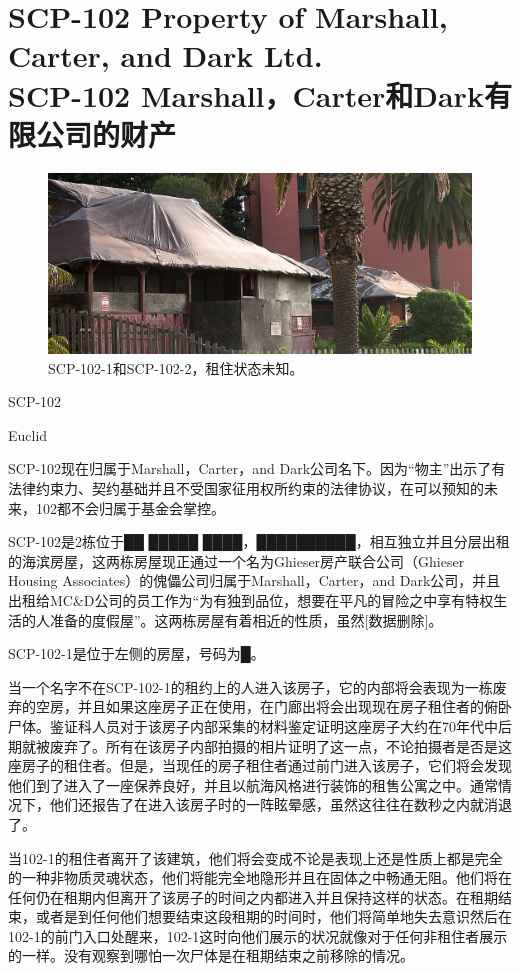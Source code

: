 \chapter[SCP-102 Marshall，Carter和Dark有限公司的财产]{
    SCP-102 Property of Marshall, Carter, and Dark Ltd.\\
    SCP-102 Marshall，Carter和Dark有限公司的财产
}

\label{chap:SCP-102}

\begin{figure}[H]
    \centering
    \includegraphics[width=0.5\linewidth]{images/SCP-102.png}
    \caption*{SCP-102-1和SCP-102-2，租住状态未知。}
\end{figure}

SCP-102

Euclid

SCP-102现在归属于Marshall，Carter，and Dark公司名下。因为“物主”出示了有法律约束力、契约基础并且不受国家征用权所约束的法律协议，在可以预知的未来，102都不会归属于基金会掌控。

SCP-102是2栋位于██ █████ ████，██████████，相互独立并且分层出租的海滨房屋，这两栋房屋现正通过一个名为Ghieser房产联合公司（Ghieser Housing Associates）的傀儡公司归属于Marshall，Carter，and Dark公司，并且出租给MC\&D公司的员工作为“为有独到品位，想要在平凡的冒险之中享有特权生活的人准备的度假屋”。这两栋房屋有着相近的性质，虽然{[}数据删除]。

SCP-102-1是位于左侧的房屋，号码为█。

当一个名字不在SCP-102-1的租约上的人进入该房子，它的内部将会表现为一栋废弃的空房，并且如果这座房子正在使用，在门廊出将会出现现在房子租住者的俯卧尸体。鉴证科人员对于该房子内部采集的材料鉴定证明这座房子大约在70年代中后期就被废弃了。所有在该房子内部拍摄的相片证明了这一点，不论拍摄者是否是这座房子的租住者。但是，当现任的房子租住者通过前门进入该房子，它们将会发现他们到了进入了一座保养良好，并且以航海风格进行装饰的租售公寓之中。通常情况下，他们还报告了在进入该房子时的一阵眩晕感，虽然这往往在数秒之内就消退了。

当102-1的租住者离开了该建筑，他们将会变成不论是表现上还是性质上都是完全的一种非物质灵魂状态，他们将能完全地隐形并且在固体之中畅通无阻。他们将在任何仍在租期内但离开了该房子的时间之内都进入并且保持这样的状态。在租期结束，或者是到任何他们想要结束这段租期的时间时，他们将简单地失去意识然后在102-1的前门入口处醒来，102-1这时向他们展示的状况就像对于任何非租住者展示的一样。没有观察到哪怕一次尸体是在租期结束之前移除的情况。

